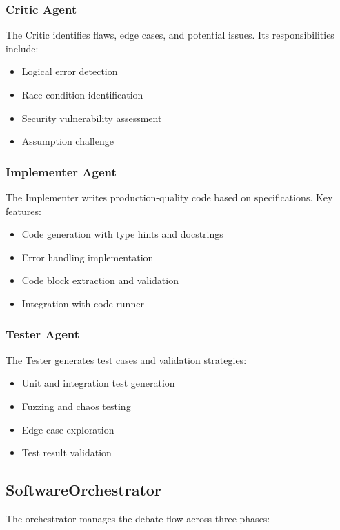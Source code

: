 \documentclass[12pt,a4paper]{article}
\begin{document}
\subsubsection{Critic Agent}
The Critic identifies flaws, edge cases, and potential issues. Its responsibilities include:
\begin{itemize}
    \item Logical error detection
    \item Race condition identification
    \item Security vulnerability assessment
    \item Assumption challenge
\end{itemize}

\subsubsection{Implementer Agent}
The Implementer writes production-quality code based on specifications. Key features:
\begin{itemize}
    \item Code generation with type hints and docstrings
    \item Error handling implementation
    \item Code block extraction and validation
    \item Integration with code runner
\end{itemize}

\subsubsection{Tester Agent}
The Tester generates test cases and validation strategies:
\begin{itemize}
    \item Unit and integration test generation
    \item Fuzzing and chaos testing
    \item Edge case exploration
    \item Test result validation
\end{itemize}

\subsection{SoftwareOrchestrator}

The orchestrator manages the debate flow across three phases:
\end{document}
